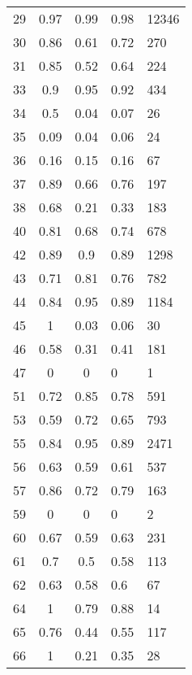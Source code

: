 \begin{longtable}[c]{|l|c|c|l|l|}
	29       & 0.97      & 0.99   & 0.98     & 12346   \\
	30       & 0.86      & 0.61   & 0.72     & 270     \\
	31       & 0.85      & 0.52   & 0.64     & 224     \\
	33       & 0.9       & 0.95   & 0.92     & 434     \\
	34       & 0.5       & 0.04   & 0.07     & 26      \\
	35       & 0.09      & 0.04   & 0.06     & 24      \\
	36       & 0.16      & 0.15   & 0.16     & 67      \\
	37       & 0.89      & 0.66   & 0.76     & 197     \\
	38       & 0.68      & 0.21   & 0.33     & 183     \\
	40       & 0.81      & 0.68   & 0.74     & 678     \\
	42       & 0.89      & 0.9    & 0.89     & 1298    \\
	43       & 0.71      & 0.81   & 0.76     & 782     \\
	44       & 0.84      & 0.95   & 0.89     & 1184    \\
	45       & 1         & 0.03   & 0.06     & 30      \\
	46       & 0.58      & 0.31   & 0.41     & 181     \\
	47       & 0         & 0      & 0        & 1       \\
	51       & 0.72      & 0.85   & 0.78     & 591     \\
	53       & 0.59      & 0.72   & 0.65     & 793     \\
	55       & 0.84      & 0.95   & 0.89     & 2471    \\
	56       & 0.63      & 0.59   & 0.61     & 537     \\
	57       & 0.86      & 0.72   & 0.79     & 163     \\
	59       & 0         & 0      & 0        & 2       \\
	60       & 0.67      & 0.59   & 0.63     & 231     \\
	61       & 0.7       & 0.5    & 0.58     & 113     \\
	62       & 0.63      & 0.58   & 0.6      & 67      \\
	64       & 1         & 0.79   & 0.88     & 14      \\
	65       & 0.76      & 0.44   & 0.55     & 117     \\
	66       & 1         & 0.21   & 0.35     & 28      \\

\end{longtable}
